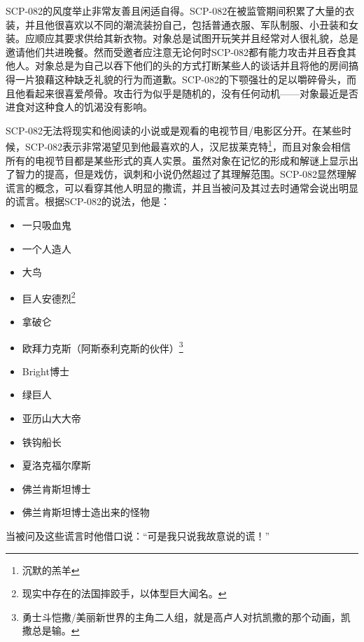 SCP-082的风度举止非常友善且闲适自得。SCP-082在被监管期间积累了大量的衣装，并且他很喜欢以不同的潮流装扮自己，包括普通衣服、军队制服、小丑装和女装。应顺应其要求供给其新衣物。对象总是试图开玩笑并且经常对人很礼貌，总是邀请他们共进晚餐。然而受邀者应注意无论何时SCP-082都有能力攻击并且吞食其他人。对象总是为自己以吞下他们的头的方式打断某些人的谈话并且将他的房间搞得一片狼藉这种缺乏礼貌的行为而道歉。SCP-082的下颚强壮的足以嚼碎骨头，而且他看起来很喜爱颅骨。攻击行为似乎是随机的，没有任何动机——对象最近是否进食对这种食人的饥渴没有影响。

SCP-082无法将现实和他阅读的小说或是观看的电视节目\slash 电影区分开。在某些时候，SCP-082表示非常渴望见到他最喜欢的人，汉尼拔莱克特\footnote{沉默的羔羊}，而且对象会相信所有的电视节目都是某些形式的真人实景。虽然对象在记忆的形成和解谜上显示出了智力的提高，但是戏仿，讽刺和小说仍然超过了其理解范围。SCP-082显然理解谎言的概念，可以看穿其他人明显的撒谎，并且当被问及其过去时通常会说出明显的谎言。根据SCP-082的说法，他是：

\begin{itemize}
\item 一只吸血鬼
\item 一个人造人
\item 大鸟
\item 巨人安德烈\footnote{现实中存在的法国摔跤手，以体型巨大闻名。}
\item 拿破仑
\item 欧拜力克斯（阿斯泰利克斯的伙伴）\footnote{勇士斗恺撒\slash 美丽新世界的主角二人组，就是高卢人对抗凯撒的那个动画，凯撒总是输。}
\item Bright博士
\item 绿巨人
\item 亚历山大大帝
\item 铁钩船长
\item 夏洛克福尔摩斯
\item 佛兰肯斯坦博士
\item 佛兰肯斯坦博士造出来的怪物
\end{itemize}

当被问及这些谎言时他借口说：“可是我只说我故意说的谎！”
